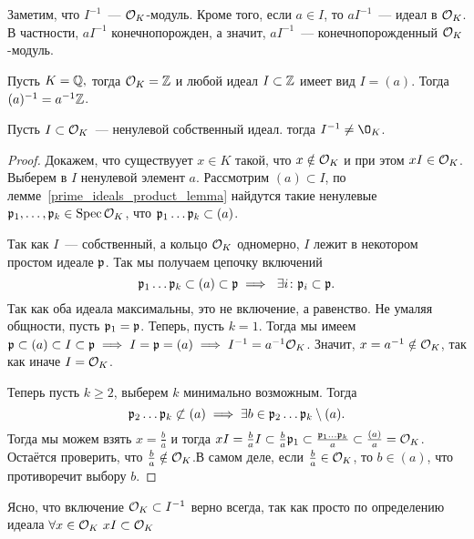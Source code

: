 	\begin{remark}
		Заметим, что $I^{-1}$~--- $\mathcal{O}_{K}$-модуль. Кроме того, если $a \in I$, то $aI^{-1}$~--- идеал в $\mathcal{O}_{K}$.
		В частности, $aI^{-1}$ конечнопорожден,  а значит, $aI^{-1}$~--- конечнопорожденный $\mathcal{O}_{K}$-модуль. 
	\end{remark}

	\begin{example}
		Пусть $K = \mathbb{Q},$ тогда $\mathcal{O}_{K} = \mathbb{Z}$ и любой идеал $I \subset \mathbb{Z}$ имеет вид $I = (a)$. Тогда $(a)^{-1} = a^{-1}\mathbb{Z}$.
	\end{example}

	\begin{lemma}\label{frac_ideal_is_not_ring}
		Пусть $I \subset \mathcal{O}_{K}$~--- ненулевой собственный идеал. тогда $I^{-1} \neq \O_{K}$.
	\end{lemma}

	\begin{proof}
		Докажем, что существуует $x \in K$ такой, что $x \notin \mathcal{O}_{K}$ и при этом $xI \in \mathcal{O}_{K}$.
		Выберем в $I$ ненулевой элемент $a$. Рассмотрим $(a) \subset I$, по лемме~\ref{prime_ideals_product_lemma} найдутся такие ненулевые 
		$\mathfrak{p}_{1}, \ldots, \mathfrak{p}_{k} \in \operatorname{Spec}{\mathcal{O}_{K}}$, что $\mathfrak{p}_{1}\ldots\mathfrak{p}_{k} \subset (a)$. 

		Так как $I$~--- собственный, а кольцо $\mathcal{O}_{K}$ одномерно, $I$ лежит в некотором простом идеале $\mathfrak{p}$. Так мы получаем цепочку включений 
		\[
			\mathfrak{p}_{1}\ldots \mathfrak{p}_{k} \subset (a) \subset \mathfrak{p} \implies \ \exists i\colon \mathfrak{p}_{i} \subset \mathfrak{p}.
 		\]
 		Так как оба идеала максимальны, это не включение, а равенство. Не умаляя общности, пусть $\mathfrak{p}_{1} = \mathfrak{p}$. Теперь, пусть $k = 1$. 
 		Тогда мы имеем $\mathfrak{p} \subset (a) \subset  I \subset \mathfrak{p} \implies I = \mathfrak{p} = (a) \implies I^{-1} = a^{-1}\mathcal{O}_{K}$. 
 		Значит, $x = a^{-1} \notin \mathcal{O}_{K}$, так как иначе $I = \mathcal{O}_{K}$. 

 		Теперь пусть $k \ge 2$, выберем $k$ минимально возможным.  Тогда 
 		\[
 			\mathfrak{p}_{2}  \ldots \mathfrak{p}_{k} \not\subset (a) \implies \exists b \in \mathfrak{p}_{2}\ldots \mathfrak{p}_{k} \setminus (a).
 		\]
 		Тогда мы можем взять $x = \frac{b}{a}$ и тогда $xI = \frac{b}{a}I \subset \frac{b}{a}\mathfrak{p}_{1} \subset \frac{\mathfrak{p}_{1}\ldots \mathfrak{p}_{k}}{a} \subset \frac{(a)}{a} = \mathcal{O}_{K}$. Остаётся проверить, что $\frac{b}{a} \notin \mathcal{O}_{K}$.В самом деле, если $\frac{b}{a} \in \mathcal{O}_{K}$, то $b \in (a)$, что противоречит выбору $b$.
	\end{proof}

	\begin{remark}
		Ясно, что включение $\mathcal{O}_{K} \subset I^{-1}$ верно всегда, так как просто по определению идеала $\forall x \in \mathcal{O}_{K} \ xI \subset \mathcal{O}_{K}$
	\end{remark}

